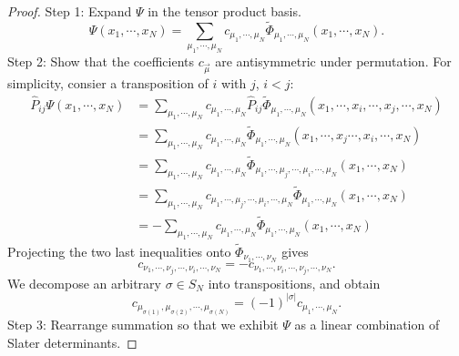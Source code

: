\documentclass{report}
\theoremstyle{plain}
\theoremstyle{definition}
\begin{document}
\begin{proof}
Step 1: Expand $\Psi$ in the tensor product basis.
\begin{equation}
  \Psi(x_1,\cdots,x_N) = \sum_{\mu_1,\cdots,\mu_N} c_{\mu_1,\cdots,\mu_N}
  \tilde{\Phi}_{\mu_1,\cdots,\mu_N}(x_1,\cdots,x_N).
\end{equation}
Step 2: Show that the coefficients $c_{\vec{\mu}}$ are antisymmetric
under permutation. For simplicity, consier a transposition of $i$ with
$j$, $i<j$:
\begin{equation}
  \begin{split}
  \hat{P}_{ij}\Psi(x_1,\cdots,x_N) 
  &= \sum_{\mu_1,\cdots,\mu_N} c_{\mu_1,\cdots,\mu_N}
  \hat{P}_{ij} \tilde{\Phi}_{\mu_1,\cdots,\mu_N}(x_1,\cdots,x_i,\cdots,x_j,\cdots,x_N) \\
  &= \sum_{\mu_1,\cdots,\mu_N} c_{\mu_1,\cdots,\mu_N}
  \tilde{\Phi}_{\mu_1,\cdots,\mu_N}(x_1,\cdots,x_j\cdots,x_i,\cdots,x_N) \\
  &= \sum_{\mu_1,\cdots,\mu_N} c_{\mu_1,\cdots,\mu_N}
  \tilde{\Phi}_{\mu_1,\cdots,\mu_j,\cdots,\mu_i,\cdots,\mu_N}(x_1,\cdots,x_N) \\
  &= \sum_{\mu_1,\cdots,\mu_N} c_{\mu_1,\cdots,\mu_j,\cdots,\mu_i,\cdots,\mu_N}
  \tilde{\Phi}_{\mu_1,\cdots,\mu_N}(x_1,\cdots,x_N) \\
  &= -\sum_{\mu_1,\cdots,\mu_N} c_{\mu_1,\cdots,\mu_N}
  \tilde{\Phi}_{\mu_1,\cdots,\mu_N}(x_1,\cdots,x_N)
\end{split}
\end{equation}
Projecting the two last inequalities onto
$\tilde{\Phi}_{\nu_1,\cdots,\nu_N}$ gives
\begin{equation}
  c_{\nu_1,\cdots,\nu_j,\cdots,\nu_i,\cdots,\nu_N} = - c_{\nu_1,\cdots,\nu_i,\cdots,\nu_j,\cdots,\nu_N}.
\end{equation}
We decompose an arbitrary $\sigma\in S_N$ into transpositions, and obtain
\begin{equation}
  c_{\mu_{\sigma(1)},\mu_{\sigma(2)},\cdots,\mu_{\sigma(N)}} =
  (-1)^{|\sigma|} c_{\mu_1,\cdots,\mu_N}.
\end{equation}
Step 3: Rearrange summation so that we exhibit $\Psi$ as a linear
combination of Slater determinants.


\end{proof}
\end{document}
